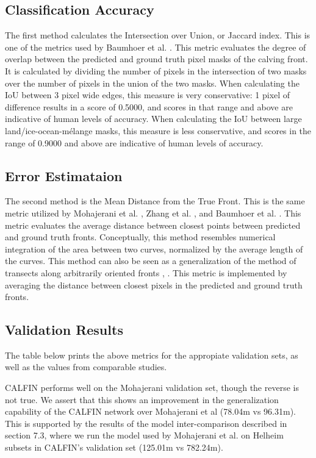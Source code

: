 \documentclass[tc, manuscript]{copernicus}
\begin{document}
\subsection{Classification Accuracy}
The first method calculates the Intersection over Union, or Jaccard index. This is one of the metrics used by Baumhoer et al. \citep{baumhoer2019}. This metric evaluates the degree of overlap between the predicted and ground truth pixel masks of the calving front. It is calculated by dividing the number of pixels in the intersection of two masks over the number of pixels in the union of the two masks. When calculating the IoU between 3 pixel wide edges, this measure is very conservative: 1 pixel of difference results in a score of 0.5000, and scores in that range and above are indicative of human levels of accuracy. When calculating the IoU between large land/ice-ocean-mélange masks, this measure is less conservative, and scores in the range of 0.9000 and above are indicative of human levels of accuracy.


\subsection{Error Estimataion}
The second method is the Mean Distance from the True Front. This is the same metric utilized by Mohajerani et al. \citep{mohajerani2019}, Zhang et al. \citep{zhang2019}, and Baumhoer et al. \citep{baumhoer2019}. This metric evaluates the average distance between closest points between predicted and ground truth fronts. Conceptually, this method resembles numerical integration of the area between two curves, normalized by the average length of the curves. This method can also be seen as a generalization of the method of transects along arbitrarily oriented fronts \citep{mohajerani2019}, \citep{baumhoer2019}. This metric is implemented by averaging the distance between closest pixels in the predicted and ground truth fronts.


\subsection{Validation Results}
The table below prints the above metrics for the appropiate validation sets, as well as the values from comparable studies. 

CALFIN performs well on the Mohajerani validation set, though the reverse is not true. We assert that this shows an improvement in the generalization capability of the CALFIN network over Mohajerani et al (78.04m vs 96.31m). This is supported by the results of the model inter-comparison described in section 7.3, where we run the model used by Mohajerani et al. on Helheim subsets in CALFIN's validation set (125.01m vs 782.24m).
\end{document}
